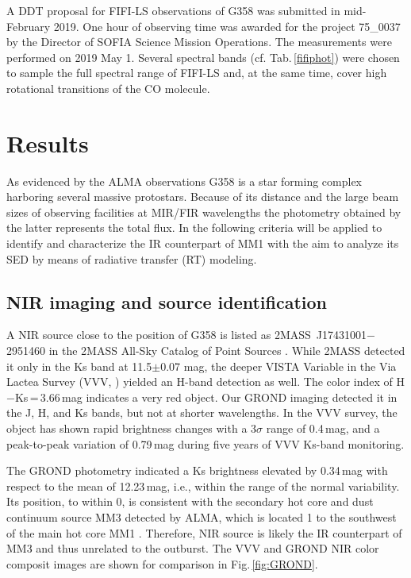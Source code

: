 \documentclass[longauth,usenatbib]{aa}
\begin{document}
A DDT proposal for FIFI-LS observations of G358 was submitted in mid-February 2019.
One hour of observing time was awarded for the project 75\_0037 by the Director of SOFIA Science Mission Operations. The measurements were performed on 2019 May 1. Several spectral bands (cf. Tab.\,\ref{fifiphot}) were chosen to sample the full spectral range of FIFI-LS and, at the same time, cover high rotational transitions of the CO molecule.


\section{Results}\label{res}

As evidenced by the ALMA observations G358 is a star forming complex harboring several massive protostars. Because of its distance and the large beam sizes of observing facilities at MIR/FIR wavelengths the photometry obtained by the latter represents the total flux. In the following criteria will be applied to identify and characterize the IR counterpart of MM1 with the aim to analyze its SED by means of radiative transfer (RT) modeling.

\subsection{NIR imaging and source identification}\label{rnir}
A NIR source close to the position of G358 is listed as 2MASS~J17431001$-$2951460 in the 2MASS All-Sky Catalog of Point Sources . While 2MASS detected it only in the Ks band at 11.5$\pm$0.07 mag, the deeper VISTA Variable in the Via Lactea Survey (VVV, ) yielded an H-band detection as well. The color index of H$-$Ks\,=\,3.66\,mag indicates a very red object. Our GROND imaging detected it in the J, H, and Ks bands, but not at shorter wavelengths. In the VVV survey, the object has shown rapid brightness changes with a 3$\sigma$ range of 0.4\,mag, and a peak-to-peak variation of 0.79\,mag during five years of VVV Ks-band monitoring. 

The GROND photometry indicated a Ks brightness elevated by 0.34\,mag with respect to the mean of 12.23\,mag, i.e., within the range of the normal variability. Its position, to within 0, is consistent with the secondary hot core and dust continuum source MM3 detected by ALMA, which is located 1 to the southwest of the main hot core MM1 . Therefore, NIR source is likely the IR counterpart of MM3 and thus unrelated to the outburst. The VVV and GROND NIR color composit images are shown for comparison in Fig.\,\ref{fig:GROND}.
\end{document}
